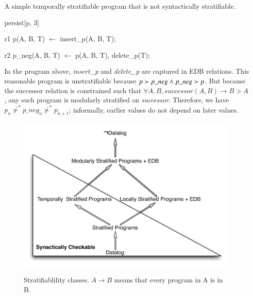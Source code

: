 \begin{example}
A simple temporally stratifiable \slang program that is not syntactically stratifiable.

\begin{Dedalus}
persist[p, 3]  
  
r1
p(A, B, T) \(\leftarrow\)
  insert\_p(A, B, T);

r2  
p_neg(A, B, T) \(\leftarrow\)
  p(A, B, T),
  delete\_p(T);
\end{Dedalus}

In the \slang program above, \emph{insert\_p} and \emph{delete\_p} are captured
in EDB relations.  This reasonable program is unstratifiable because $p \succ
p\nega \land p\nega \succ p$.  But because the successor relation is
constrained such that $\forall A,B, successor(A, B) \rightarrow B > A$, any
such program is modularly stratified on \emph{successor}.  Therefore, we have
$p_{n} \not\succ^* p\_neg_{n} \not\succ^* p_{n+1}$; informally, earlier values
do not depend on later values.
\end{example}

\begin{figure}[t]
  \centering
  \includegraphics[width=0.75\linewidth]{figures/dedalus_classes.pdf}
  \label{fig:dedalus-classes}
  \caption{Stratifiablility classes.  $A \to B$ means that every program in A is in B.}
\vspace{-8pt}
\end{figure}



